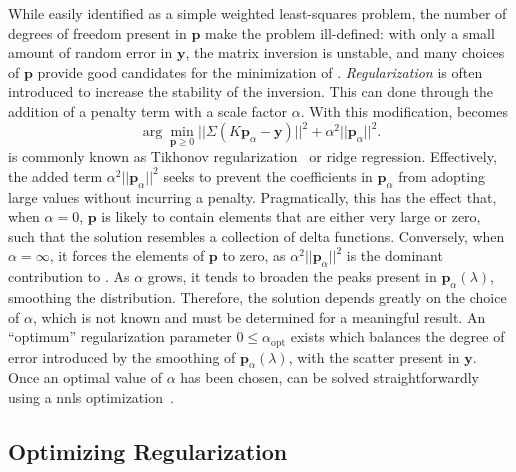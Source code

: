 While easily identified as a simple weighted least-squares problem, the number of degrees of freedom present in $\mathbf{p}$ make the problem ill-defined: with only a small amount of random error in $\mathbf{y}$, the matrix inversion is unstable, and many choices of $\mathbf{p}$ provide good candidates for the minimization of . 
\emph{Regularization} is often introduced to increase the stability of the inversion.
This can done through the addition of a penalty term with a scale factor $\alpha$.
With this modification,  becomes
%
\begin{equation}
\label{eq:rnnls}
   \arg \min_{\mathbf{p} \geq 0} || \Sigma(K \mathbf{p}_\alpha - \mathbf{y}) ||^{2} + \alpha^2 || \mathbf{p}_\alpha ||^{2} .
\end{equation}
%
 is commonly known as Tikhonov regularization~\cite{1995-Tikhonov-NMSIPP} or ridge regression.
Effectively, the added term $\alpha^2 || \mathbf{p}_\alpha ||^{2}$ seeks to prevent the coefficients in $\mathbf{p}_\alpha$ from adopting large values without incurring a penalty.
Pragmatically, this has the effect that, when $\alpha = 0$, $\mathbf{p}$ is likely to contain elements that are either very large or zero, such that the solution resembles a collection of delta functions.
Conversely, when $\alpha = \infty$, it forces the elements of $\mathbf{p}$ to zero, as $\alpha^2 || \mathbf{p}_\alpha ||^{2}$ is the dominant contribution to .
As $\alpha$ grows, it tends to broaden the peaks present in $\mathbf{p}_\alpha(\lambda)$, smoothing the distribution. Therefore, the solution depends greatly on the choice of $\alpha$, which is not known  and must be determined for a meaningful result. An ``optimum'' regularization parameter $0 \leq \alpha_\mathrm{opt}$ exists which balances the degree of error introduced by the smoothing of $\mathbf{p}_\alpha(\lambda)$, with the scatter present in $\mathbf{y}$. Once an optimal value of $\alpha$ has been chosen,  can be solved straightforwardly using a \gls{nnls} optimization~\cite{1995-Lawson-SLSP}.

\subsection{Optimizing Regularization}

